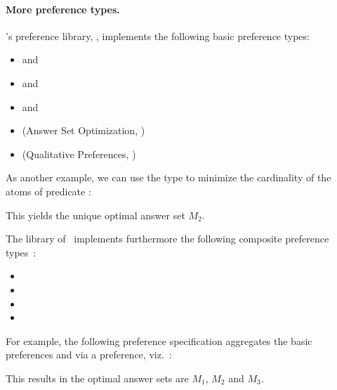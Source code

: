 \paragraph{More preference types.}

\asprin's preference library, , implements the following basic preference types:
\begin{itemize}
	\item  {} and    
	\item  {} and    
	\item  {} and    
	\item  {}   (Answer Set Optimization, \cite{brnitr03a})   
	\item  {} (Qualitative Preferences, \cite{rogima10a})  
\end{itemize}
As another example, 
we can use the type  to minimize the cardinality of the atoms of predicate : 
%

This yields the unique optimal answer set $M_2$.

The library of \asprin\ implements furthermore the following composite preference types~\cite{sonpon06a}: 
\begin{itemize}
\item \code{and}
\item {}
\item {}
\item {}
\end{itemize}

For example, 
the following preference specification 
aggregates the basic preferences  and 
via a \code{pareto} preference, viz.~: 
%

%
This results in the optimal answer sets are $M_1$, $M_2$ and $M_3$.

